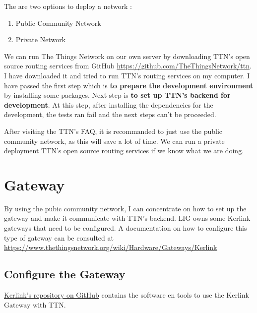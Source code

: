 \documentclass[a4paper]{article}
\begin{document}
\begin{flushleft}
The are two options to deploy a network :
\end{flushleft}
 \begin{enumerate}
  \item Public Community Network
  \item Private Network
 \end{enumerate}
 
We can run The Things Network on our own server by downloading TTN's open source routing services from GitHub 
\url{https://github.com/TheThingsNetwork/ttn}. I have downloaded it and tried to run TTN's routing services on my computer.
I have passed the first step which is \textbf{to prepare the development environment} by installing some packages.
Next step is \textbf{to set up TTN's backend for development}. At this step, after installing the dependencies for the development,
the tests ran fail and the next steps can't be proceeded.

After visiting the TTN's FAQ, it is recommanded to just use the public community network, as this will save a lot of time.
We can run a private deployment TTN's open source routing services if we know what we are doing.

\section{Gateway}

By using the pubic community network, I can concentrate on how to set up the gateway and make it communicate with TTN's backend.
LIG owns some Kerlink gateways that need to be configured. A documentation on how to configure this type of gateway can be consulted at 
\url{https://www.thethingsnetwork.org/wiki/Hardware/Gateways/Kerlink}

\subsection{Configure the Gateway}
\href{https://github.com/TheThingsNetwork/kerlink-station-firmware}{Kerlink's repository on GitHub} contains the software en tools to use the Kerlink Gateway with TTN. 
\newline 
\end{document}
